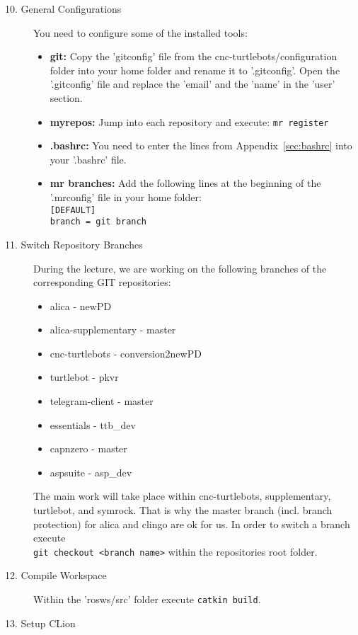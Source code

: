 \begin{description}
\begin{itemize}
	\end{itemize}
	\item[10. General Configurations] You need to configure some of the installed tools:
		\begin{itemize}
			\item \textbf{git:} Copy the 'gitconfig' file from the cnc-turtlebots/configuration folder into your home folder and rename it to '.gitconfig'. Open the '.gitconfig' file and replace the 'email' and the 'name' in the 'user' section.
			\item \textbf{myrepos:} Jump into each repository and execute: \verb#mr register#
			\item \textbf{.bashrc:} You need to enter the lines from Appendix~\ref{sec:bashrc} into your '.bashrc' file.
			\item \textbf{mr branches:} Add the following lines at the beginning of the '.mrconfig' file in your home folder:\\
			\verb#[DEFAULT]#\\
			\verb#branch = git branch#
		\end{itemize}
	\item[11. Switch Repository Branches] During the lecture, we are working on the following branches of the corresponding GIT repositories:
	\begin{itemize}
		\item alica - newPD
		\item alica-supplementary - master
		\item cnc-turtlebots - conversion2newPD
		\item turtlebot - pkvr
		\item telegram-client - master
		\item essentials - ttb\_dev
		\item capnzero - master
		\item aspsuite - asp\_dev
	\end{itemize}
	The main work will take place within cnc-turtlebots, supplementary, turtlebot, and symrock. That is why the master branch (incl. branch protection) for alica and clingo are ok for us. In order to switch a branch execute\\\verb#git checkout <branch name># within the repositories root folder.
	\item[12. Compile Workspace] Within the 'rosws/src' folder execute \verb#catkin build#.
	\item[13. Setup CLion]
\end{description}

